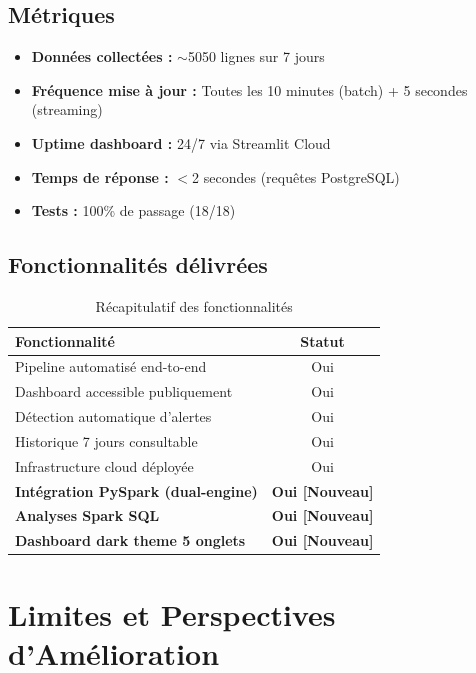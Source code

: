 \documentclass[12pt,a4paper]{article}
\begin{document}
\subsection{Métriques}
\begin{itemize}[noitemsep]
    \item \textbf{Données collectées :} $\sim$5050 lignes sur 7 jours
    \item \textbf{Fréquence mise à jour :} Toutes les 10 minutes (batch) + 5 secondes (streaming)
    \item \textbf{Uptime dashboard :} 24/7 via Streamlit Cloud
    \item \textbf{Temps de réponse :} $<$2 secondes (requêtes PostgreSQL)
    \item \textbf{Tests :} 100\% de passage (18/18)
\end{itemize}

\subsection{Fonctionnalités délivrées}

\begin{table}[H]
\centering
\begin{tabular}{|l|c|}
\hline
\textbf{Fonctionnalité} & \textbf{Statut} \\
\hline
Pipeline automatisé end-to-end & Oui \\
\hline
Dashboard accessible publiquement & Oui \\
\hline
Détection automatique d'alertes & Oui \\
\hline
Historique 7 jours consultable & Oui \\
\hline
Infrastructure cloud déployée & Oui \\
\hline
\textbf{Intégration PySpark (dual-engine)} & \textbf{Oui [Nouveau]} \\
\hline
\textbf{Analyses Spark SQL} & \textbf{Oui [Nouveau]} \\
\hline
\textbf{Dashboard dark theme 5 onglets} & \textbf{Oui [Nouveau]} \\
\hline
\end{tabular}
\caption{Récapitulatif des fonctionnalités}
\end{table}

\section{Limites et Perspectives d'Amélioration}
\end{document}
